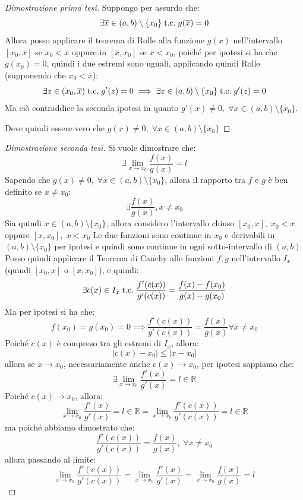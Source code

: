 \documentclass[a4paper,12pt,openright]{book}
\begin{document}
	\begin{proof}[Dimostrazione prima tesi]
		Suppongo per assurdo che:
		\[\exists \overline{x} \in (a,b) \setminus \{x_0\} \;\text{t.c.}\; g(\overline{x}) = 0\]
		Allora posso applicare il teorema di Rolle alla funzione $g(x)$ nell'intervallo $[x_0, \overline{x}]$ se $x_0 < \overline{x}$ oppure in $[\overline{x}, x_0]$ se $\overline{x} < x_0$, poiché per ipotesi si ha che $g(x_0) = 0$, quindi i due estremi sono uguali, applicando quindi Rolle (supponendo che $x_0 < \overline{x}$):
		\[\exists z \in (x_0, \overline{x}) \;\text{t.c.}\; g'(z) = 0 \implies \exists z \in (a, b) \setminus \{x_0\} \;\text{t.c.}\; g'(z) = 0\]
		Ma ciò contraddice la seconda ipotesi in quanto $g'(x) \not = 0, \; \forall x \in (a, b) \setminus \{x_0\}$.
		
		Deve quindi essere vero che $g(x) \not = 0, \; \forall x \in (a, b) \setminus \{x_0\}$ 
	\end{proof}
	\begin{proof}[Dimostrazione seconda tesi]
		Si vuole dimostrare che:
		\[\exists \lim_{x \rightarrow x_0} \frac{f(x)}{g(x)} = l\]
		Sapendo che $g(x) \not = 0, \; \forall x \in (a, b) \setminus \{x_0\}$, allora il rapporto tra $f$ e $g$ è ben definito se $x \not = x_0$:
		\[\exists \frac{f(x)}{g(x)}, x \not = x_0\]
		Sia quindi $x \in (a,b) \setminus \{x_0\}$, allora considero l'intervallo chiuso $[x_0, x], \; x_0 < x$ oppure $[x, x_0], \; x < x_0$
		Le due funzioni sono continue in $x_0$ e derivabili in $(a,b) \setminus \{x_0\}$ per ipotesi e quindi sono continue in ogni sotto-intervallo di $(a, b)$
		Posso quindi applicare il Teorema di Cauchy alle funzioni $f, g$ nell'intervallo $I_x$ (quindi $[x_0, x]$ o $[x, x_0]$), e quindi:
		\[\exists c(x) \in I_x \;\text{t.c.}\; \frac{f'(c(x))}{g'(c(x))} = \frac{f(x) - f(x_0)}{g(x) - g(x_0)}\]
		Ma per ipotesi si ha che:
		\[f(x_0) = g(x_0) = 0 \implies \frac{f'(c(x))}{g'(c(x))} = \frac{f(x)}{g(x)} \forall x \not = x_0\]
		Poiché $c(x)$ è compreso tra gli estremi di $I_x$, allora:
		\[|c(x) - x_0| \leq |x - x_0|\]
		allora se $x \longrightarrow x_0$, necessariamente anche $c(x) \longrightarrow x_0$, per ipotesi sappiamo che:
		\[\exists \lim_{x \rightarrow x_0} \frac{f'(x)}{g'(x)} = l \in \mathbb{R}\]
		Poiché $c(x) \longrightarrow x_0$, allora:
		\[\lim_{x \rightarrow x_0} \frac{f'(x)}{g'(x)} = l \in \mathbb{R} = \lim_{x \rightarrow x_0} \frac{f'(c(x))}{g'(c(x))} = l \in \mathbb{R}\]
		ma poiché abbiamo dimostrato che:
		\[\frac{f'(c(x))}{g'(c(x))} = \frac{f(x)}{g(x)}, \; \forall x \not = x_0\]
		allora passando al limite:
		\[\lim_{x \rightarrow x_0} \frac{f'(c(x))}{g'(c(x))} = \lim_{x \rightarrow x_0} \frac{f'(x)}{g'(x)} = \lim_{x \rightarrow x_0} \frac{f(x)}{g(x)} = l\]
	\end{proof}
	
\end{document}
